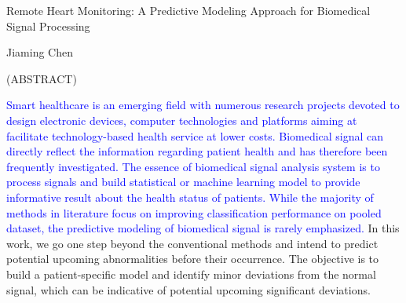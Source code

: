 
\begin{center}

\vfill

{\large Remote Heart Monitoring: A Predictive Modeling Approach for Biomedical Signal Processing }


Jiaming Chen

{(ABSTRACT)}




\vfill

\end{center}

\textcolor{blue}{Smart healthcare is an emerging field with numerous research projects devoted to design electronic devices, computer technologies and platforms aiming at facilitate technology-based health service at lower costs. Biomedical signal can directly reflect the information regarding patient health and has therefore been frequently investigated. The essence of biomedical signal analysis system is to process signals and build statistical or machine learning model to provide informative result about the health status of patients. While the majority of methods in literature focus on improving classification performance on pooled dataset, the predictive modeling of biomedical signal is rarely emphasized.} %
 In this work, we go one step beyond the conventional methods and intend to predict potential upcoming abnormalities before their occurrence. The objective is to build a patient-specific model and identify minor deviations from the normal signal, which can be indicative of potential upcoming significant deviations. 

